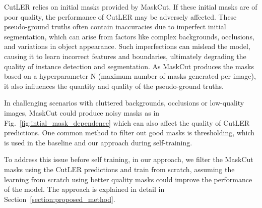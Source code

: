 CutLER relies on initial masks provided by MaskCut. If these initial masks are of poor quality, the performance of CutLER may be adversely affected. These pseudo-ground truths often contain inaccuracies due to imperfect initial segmentation, which can arise from factors like complex backgrounds, occlusions, and variations in object appearance. Such imperfections can mislead the model, causing it to learn incorrect features and boundaries, ultimately degrading the quality of instance detection and segmentation. As MaskCut produces the masks based on a hyperparameter N (maximum number of masks generated per image), it also influences the quantity and quality of the pseudo-ground truths.

In challenging scenarios with cluttered backgrounds, occlusions or low-quality images, MaskCut could produce noisy masks as in Fig.~\ref{fig:intial_mask_dependence} which can also affect the quality of CutLER predictions. One common method to filter out good masks is thresholding, which is used in the baseline and our approach during self-training.


To address this issue before self training, in our approach, we filter the MaskCut masks using the CutLER predictions and train from scratch, assuming the learning from scratch using better quality masks could improve the performance of the model. The approach is explained in detail in Section~\ref{section:proposed_method}.


